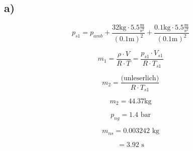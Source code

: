 

\subsection*{a)}
\[
p_{s1} = p_{amb} + \frac{32 \text{kg} \cdot 5.5 \frac{\text{m}}{\text{s}^2}}{(0.1 \text{m})^2} + \frac{0.1 \text{kg} \cdot 5.5 \frac{\text{m}}{\text{s}^2}}{(0.1 \text{m})^2}
\]

\[
m_1 = \frac{\rho \cdot V}{R \cdot T} = \frac{p_{s1} \cdot V_{s1}}{R \cdot T_{s1}}
\]

\[
m_2 = \frac{\text{(unleserlich)}}{R \cdot T_{s1}}
\]

\[
m_2 = 44.37 \text{kg}
\]

\[
p_{ng} = 1.4 \text{ bar}
\]

\[
m_{ns} = 0.003242 \text{ kg}
\]

\[
= 3.92 \text{ s}
\]